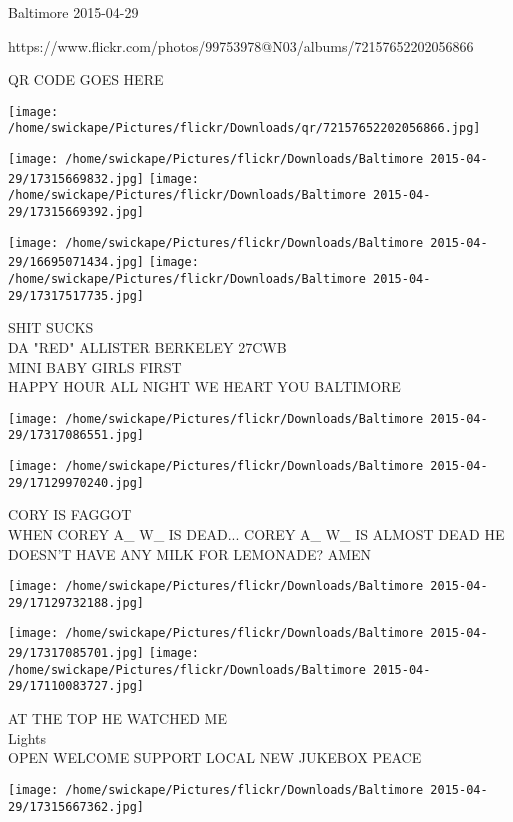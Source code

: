 \documentclass[10pt,letterpaper]{article}
\begin{document}
Baltimore 2015-04-29

https://www.flickr.com/photos/99753978@N03/albums/72157652202056866

QR CODE GOES HERE

\texttt{[image: /home/swickape/Pictures/flickr/Downloads/qr/72157652202056866.jpg]}
\pagebreak

\texttt{[image: /home/swickape/Pictures/flickr/Downloads/Baltimore 2015-04-29/17315669832.jpg]}
\texttt{[image: /home/swickape/Pictures/flickr/Downloads/Baltimore 2015-04-29/17315669392.jpg]}

\texttt{[image: /home/swickape/Pictures/flickr/Downloads/Baltimore 2015-04-29/16695071434.jpg]}
\texttt{[image: /home/swickape/Pictures/flickr/Downloads/Baltimore 2015-04-29/17317517735.jpg]}

SHIT SUCKS\\
DA "RED" ALLISTER BERKELEY 27CWB\\
MINI BABY GIRLS FIRST\\
HAPPY HOUR ALL NIGHT WE HEART YOU BALTIMORE\\
\pagebreak

\texttt{[image: /home/swickape/Pictures/flickr/Downloads/Baltimore 2015-04-29/17317086551.jpg]}

\vspace{0.25in}
\texttt{[image: /home/swickape/Pictures/flickr/Downloads/Baltimore 2015-04-29/17129970240.jpg]}

CORY IS FAGGOT\\
WHEN COREY A\_ W\_ IS DEAD...  COREY A\_ W\_ IS ALMOST DEAD HE DOESN'T HAVE ANY MILK FOR LEMONADE?  AMEN\\
\pagebreak

\texttt{[image: /home/swickape/Pictures/flickr/Downloads/Baltimore 2015-04-29/17129732188.jpg]}

\vspace{0.25in}
\texttt{[image: /home/swickape/Pictures/flickr/Downloads/Baltimore 2015-04-29/17317085701.jpg]}
\texttt{[image: /home/swickape/Pictures/flickr/Downloads/Baltimore 2015-04-29/17110083727.jpg]}

AT THE TOP HE WATCHED ME\\
Lights\\
OPEN WELCOME SUPPORT LOCAL NEW JUKEBOX PEACE\\
\pagebreak

\texttt{[image: /home/swickape/Pictures/flickr/Downloads/Baltimore 2015-04-29/17315667362.jpg]}
\end{document}
